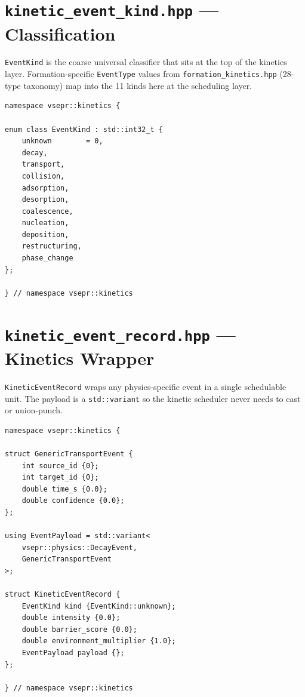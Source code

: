 \documentclass[11pt,a4paper]{article}
\begin{document}
\section{\texttt{kinetic\_event\_kind.hpp} --- Classification}
\label{sec:eventkind}

\texttt{EventKind} is the coarse universal classifier that sits at the top
of the kinetics layer.  Formation-specific \texttt{EventType} values from
\texttt{formation\_kinetics.hpp} (28-type taxonomy) map into the 11 kinds
here at the scheduling layer.

\begin{lstlisting}[style=cpp20, caption={\texttt{include/kinetics/kinetic\_event\_kind.hpp}}]
namespace vsepr::kinetics {

enum class EventKind : std::int32_t {
    unknown        = 0,
    decay,
    transport,
    collision,
    adsorption,
    desorption,
    coalescence,
    nucleation,
    deposition,
    restructuring,
    phase_change
};

} // namespace vsepr::kinetics
\end{lstlisting}

\section{\texttt{kinetic\_event\_record.hpp} --- Kinetics Wrapper}
\label{sec:record}

\texttt{KineticEventRecord} wraps any physics-specific event in a single
schedulable unit.  The payload is a \texttt{std::variant} so the kinetic
scheduler never needs to cast or union-punch.

\begin{lstlisting}[style=cpp20, caption={\texttt{include/kinetics/kinetic\_event\_record.hpp}}]
namespace vsepr::kinetics {

struct GenericTransportEvent {
    int source_id {0};
    int target_id {0};
    double time_s {0.0};
    double confidence {0.0};
};

using EventPayload = std::variant<
    vsepr::physics::DecayEvent,
    GenericTransportEvent
>;

struct KineticEventRecord {
    EventKind kind {EventKind::unknown};
    double intensity {0.0};
    double barrier_score {0.0};
    double environment_multiplier {1.0};
    EventPayload payload {};
};

} // namespace vsepr::kinetics
\end{lstlisting}
\end{document}
